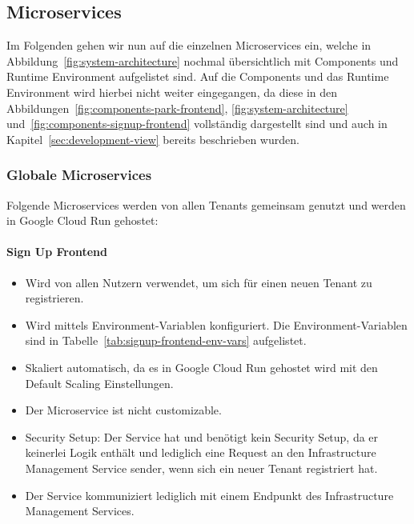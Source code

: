 \subsection{Microservices}
Im Folgenden gehen wir nun auf die einzelnen Microservices ein, welche in Abbildung~\ref{fig:system-architecture} nochmal übersichtlich mit Components und Runtime Environment aufgelistet sind.
Auf die Components und das Runtime Environment wird hierbei nicht weiter eingegangen, da diese in den Abbildungen~\ref{fig:components-park-frontend}, \ref{fig:system-architecture} und~\ref{fig:components-signup-frontend} vollständig dargestellt sind und auch in Kapitel~\ref{sec:development-view} bereits beschrieben wurden.

\subsubsection{Globale Microservices}
Folgende Microservices werden von allen Tenants gemeinsam genutzt und werden in Google Cloud Run gehostet:

\paragraph{Sign Up Frontend}
\begin{itemize}
	\item Wird von allen Nutzern verwendet, um sich für einen neuen Tenant zu registrieren.
	\item Wird mittels Environment-Variablen konfiguriert. Die Environment-Variablen sind in Tabelle~\ref{tab:signup-frontend-env-vars} aufgelistet.
	\item Skaliert automatisch, da es in Google Cloud Run gehostet wird mit den Default Scaling Einstellungen.
	\item Der Microservice ist nicht customizable.
	\item Security Setup: Der Service hat und benötigt kein Security Setup, da er keinerlei Logik enthält und lediglich eine Request an den Infrastructure Management Service sender, wenn sich ein neuer Tenant registriert hat.
	\item Der Service kommuniziert lediglich mit einem Endpunkt des Infrastructure Management Services.
\end{itemize}

